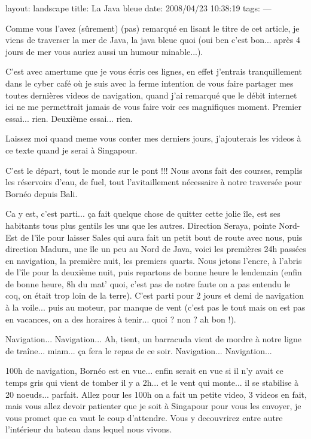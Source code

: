 layout: landscape
title: La Java bleue
date: 2008/04/23 10:38:19
tags:
---

Comme vous l'avez (sûrement) (pas) remarqué en lisant le titre de cet article, je viens de traverser la mer de Java, la java bleue quoi (oui ben c'est bon... après 4 jours de mer vous auriez aussi un humour minable...).

C'est avec amertume que je vous écris ces lignes, en effet j'entrais tranquillement dans le cyber café où je suis avec la ferme intention de vous faire partager mes toutes dernières videos de navigation, quand j'ai remarqué que le débit internet ici ne me permettrait jamais de vous faire voir ces magnifiques moment. Premier essai... rien. Deuxième essai... rien.

Laissez moi quand meme vous conter mes derniers jours, j'ajouterais les videos à ce texte quand je serai à Singapour.

C'est le départ, tout le monde sur le pont !!! Nous avons fait des courses, remplis les réservoirs d'eau, de fuel, tout l'avitaillement nécessaire à notre traversée pour Bornéo depuis Bali.

Ca y est, c'est parti... ça fait quelque chose de quitter cette jolie île, est ses habitants tous plus gentils les uns que les autres. Direction Seraya, pointe Nord-Est de l'île pour laisser Sales qui aura fait un petit bout de route avec nous, puis direction Madura, une île un peu au Nord de Java, voici les premières 24h passées en navigation, la première nuit, les premiers quarts. Nous jetons l'encre, à l'abris de l'île pour la deuxième nuit, puis repartons de bonne heure le lendemain (enfin de bonne heure, 8h du mat' quoi, c'est pas de notre faute on a pas entendu le coq, on était trop loin de la terre). C'est parti pour 2 jours et demi de navigation à la voile... puis au moteur, par manque de vent (c'est pas le tout mais on est pas en vacances, on a des horaires à tenir... quoi ? non ? ah bon !).

Navigation... Navigation... Ah, tient, un barracuda vient de mordre à notre ligne de traîne... miam... ça fera le repas de ce soir. Navigation... Navigation...

100h de navigation, Bornéo est en vue... enfin serait en vue si il n'y avait ce temps gris qui vient de tomber il y a 2h... et le vent qui monte... il se stabilise à 20 noeuds... parfait. Allez pour les 100h on a fait un petite video, 3 videos en fait, mais vous allez devoir patienter que je soit à Singapour pour vous les envoyer, je vous promet que ca vaut le coup d'attendre. Vous y decouvrirez entre autre l'intérieur du bateau dans lequel nous vivons.

